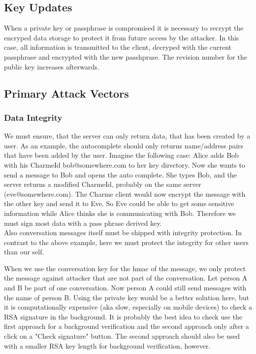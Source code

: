 \documentclass{scrartcl}
\begin{document}
    \subsection{Key Updates}
    When a private key or passphrase is compromised  it is necessary to recrypt the encryped data storage to protect it from future access by the attacker. In this case, all information is transmitted to the client, decryped with the current passphrase and encrypted with the new passhprase. The revision number for the public key increases afterwards. 

  \subsection{Primary Attack Vectors}
  
  \subsubsection{Data Integrity}
We must ensure, that the server can only return data, that has been created by a user. 
As an example, the autocomplete should only returns name/address pairs that have been added by the user. Imagine the following case: Alice adds Bob with his CharmeId bob@somewhere.com to her key directory. Now she wants to send a message to Bob and opens the auto complete. She types Bob, and the server returns a modified CharmeId, probably on the same server (eve@somewhere.com). The Charme client would now encrypt the message with the other key and send it to Eve. So Eve could be able to get some sensitive information while Alice thinks she is communicating with Bob.
Therefore we must sign most data with a pass phrase derived key.\\

  Also conversation messages itself must be shipped with integrity protection. In contrast to the above example, here we must protect the integrity for other users than our self.

When we use the conversation key for the hmac of the message, we only protect the message against attacker that are not part of the conversation. Let person A and B be part of one conversation. Now person A could still send messages with the name of person B. Using the private key would be a better solution here, but it is computationally expensive (aka slow, especially on mobile devices) to check a RSA signature in the background. It is probably the best idea to check use the first approach for a background verification and the second approach only after a click on a "Check signature" button. The second approach should also be used with a smaller RSA key length for background verification, however.
\end{document}
